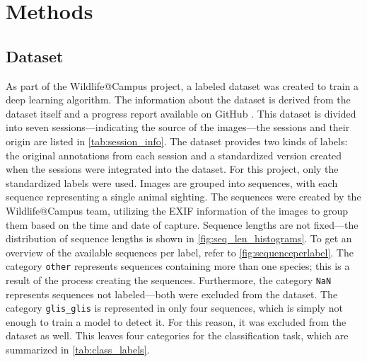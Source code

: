

\section{Methods}
\label{methods}

    \subsection{Dataset}
    As part of the Wildlife@Campus project, a labeled dataset was created to train a deep learning algorithm.
    The information about the dataset is derived from the dataset itself and a progress report available on GitHub \autocite{ratnaweeraWildlifeCampusProgressReports2021}.
    This dataset is divided into seven sessions---indicating the source of the images---the sessions and their origin are listed in \autoref{tab:session_info}.
    The dataset provides two kinds of labels: the original annotations from each session and a standardized version created when the sessions were integrated into the dataset.
    For this project, only the standardized labels were used.
    Images are grouped into sequences, with each sequence representing a single animal sighting.
    The sequences were created by the Wildlife@Campus team, utilizing the \ac{EXIF} information of the images to group them based on the time and date of capture.
    Sequence lengths are not fixed---the distribution of sequence lengths is shown in \autoref{fig:seq_len_histograms}.
    To get an overview of the available sequences per label, refer to \autoref{fig:sequenceperlabel}.
    The category \texttt{other} represents sequences containing more than one species; this is a result of the process creating the sequences.
    Furthermore, the category \texttt{NaN} represents sequences not labeled---both were excluded from the dataset.
    The category \texttt{glis\_glis} is represented in only four sequences, which is simply not enough to train a model to detect it.
    For this reason, it was excluded from the dataset as well.
    This leaves four categories for the classification task, which are summarized in \autoref{tab:class_labels}.

    

